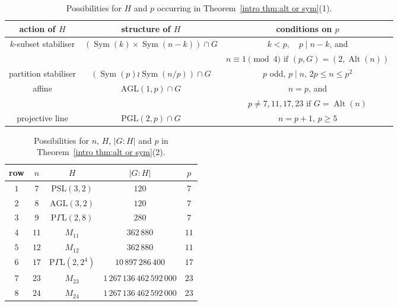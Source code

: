 \documentclass{article}
\theoremstyle{remark}
\theoremstyle{definition}
\DeclareMathOperator{\Alt}{Alt}
\DeclareMathOperator{\Sym}{Sym}
\newcommand{\AGL}{\mathrm{AGL}}
\newcommand{\PGL}{\mathrm{PGL}}
\newcommand{\PSL}{\mathrm{PSL}}
\begin{document}
 \begin{table}
     \centering
     \begin{tabular}{c |c | c}
          action of $H$ & structure of $H$  &  conditions  on $p$\\ \hline 
                     $k$-subset stabiliser & $(\Sym(k) \times \Sym(n-k) )\cap G$ &    $ k < p , \quad  p\mid n-k$, and \\ & &    $n\equiv 1 \pmod{4} \text{ if } (p,G)=(2,\Alt(n)) $  \\ 
          partition stabiliser & $(\Sym(p) \wr \Sym(n/p) )\cap G$ &  $p$ odd, \quad  $p \mid n$, \quad $2p\leqslant n\leqslant p^2$  \\ 
                     affine & $ \AGL(1,p) \cap G$ &  $ n=p$, and\\  &&
 $p\neq 7,11,17,23\text{ if }G=\Alt(n)$    \\ 
          projective line &  $\PGL(2,p) \cap G$ &  $n=p+1$, \quad $p\geqslant 5$    
     \end{tabular}
     \caption{Possibilities for $H$  and $p$ occurring in Theorem~\ref{intro thm:alt or sym}(1).}
     \label{tab:infinite families}
 \end{table}

\begin{table}
    \centering
    \begin{tabular}{c|c|c|c|c}
        row & $n$ & $H$ &  $|G:H|$ & $p$\\ \hline
        $1$ & $7$ & $\PSL(3,2)$ & $120$ & $7$ \\
        $2$ &  $8$ & $\AGL(3,2)$ & $120$ & $7$ \\
        $3$ & $9$ & $\mathrm{P}\Gamma\mathrm{L}(2,8)$ & $280$  & $7$ \\
        $4$ &  $11$ & $M_{11}$& $362\,880$ & $11$ \\
        $5$ & $12$ & $ M_{12}$ & $362\,880$ &  $11$ \\
        $6$ & $17$ & $\mathrm{P}\Gamma\mathrm{L}(2,2^4)$ & $10\,897\,286\,400$ & $17$ \\
        $7$ & $23$ & $M_{23}$ & $1\,267\,136\,462\,592\,000$ & $23$  \\
        $8$ & $24$ & $M_{24}$ & $1\,267\,136\,462\,592\,000$ & $23$ \\ 
    \end{tabular}
    \caption{Possibilities for $n$, $H$, $|G:H|$  and $p$ in Theorem~\ref{intro thm:alt or sym}(2).}
    \label{tab:exceps for altn}
\end{table}
\end{document}
